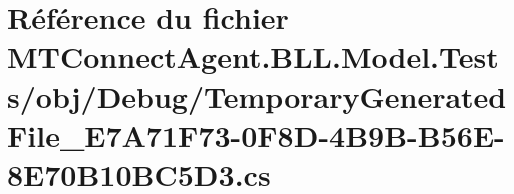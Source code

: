 \hypertarget{_m_t_connect_agent_8_b_l_l_8_model_8_tests_2obj_2_debug_2_temporary_generated_file___e7_a71_f73-9fa12d7e7c1177d71c4872ac6c3a140c}{}\section{Référence du fichier M\+T\+Connect\+Agent.\+B\+L\+L.\+Model.\+Tests/obj/\+Debug/\+Temporary\+Generated\+File\+\_\+\+E7\+A71\+F73-\/0\+F8\+D-\/4\+B9\+B-\/\+B56\+E-\/8\+E70\+B10\+B\+C5\+D3.cs}
\label{_m_t_connect_agent_8_b_l_l_8_model_8_tests_2obj_2_debug_2_temporary_generated_file___e7_a71_f73-9fa12d7e7c1177d71c4872ac6c3a140c}

